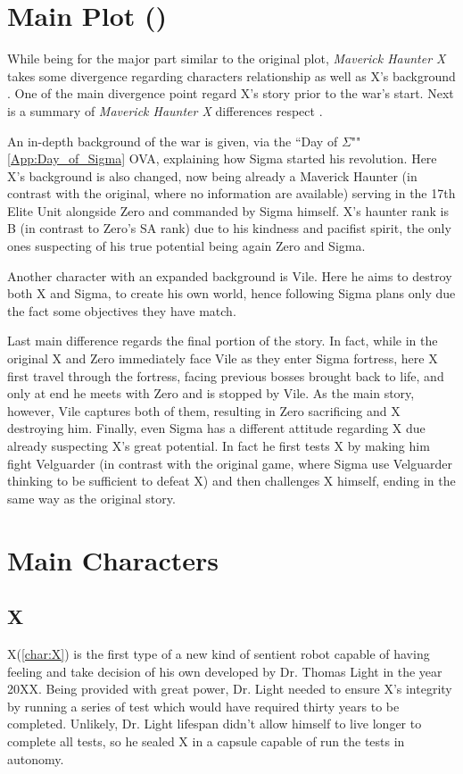 \section{Main Plot (\mhx)}
While being for the major part similar to the original plot, \textit{Maverick Haunter X} takes some divergence regarding characters relationship as well as X's background \cite{wiki:MM_MHX}. One of the main divergence point regard X's story prior to the war's start. Next is a summary of \textit{Maverick Haunter X} differences respect \x.

An in-depth background of the war is given, via the ``Day of $\Sigma$""\ref{App:Day_of_Sigma} OVA, explaining how Sigma started his revolution. Here X's background is also changed, now being already a Maverick Haunter (in contrast with the original, where no information are available) serving in the 17th Elite Unit alongside Zero and commanded by Sigma himself. X's haunter rank is B (in contrast to Zero's SA rank) due to his kindness and pacifist spirit, the only ones suspecting of his true potential being again Zero and Sigma. 

Another character with an expanded background is Vile. Here he aims to destroy both X and Sigma, to create his own world, hence following Sigma plans only due the fact some objectives they have match.

Last main difference regards the final portion of the story\cite{wiki:MM_MHX_script}. In fact, while in the original X and Zero immediately face Vile as they enter Sigma fortress, here X first travel through the fortress, facing previous bosses brought back to life, and only at end he meets with Zero and is stopped by Vile. As the main story, however, Vile captures both of them, resulting in Zero sacrificing and X destroying him. Finally, even Sigma has a different attitude regarding X due already suspecting X's great potential. In fact he first tests X by making him fight Velguarder (in contrast with the original game, where Sigma use Velguarder thinking to be sufficient to defeat X) and then challenges X himself, ending in the same way as the original story.	

\section{Main Characters}
\subsection{X}
X(\ref{char:X}) is the first type of a new kind of sentient robot capable of having feeling and take decision of his own developed by Dr. Thomas Light in the year 20XX. Being provided with great power, Dr. Light needed to ensure X's integrity by running a series of test which would have required thirty years to be completed. Unlikely, Dr. Light lifespan didn't allow himself to live longer to complete all tests, so he sealed X in a capsule capable of run the tests in autonomy.


